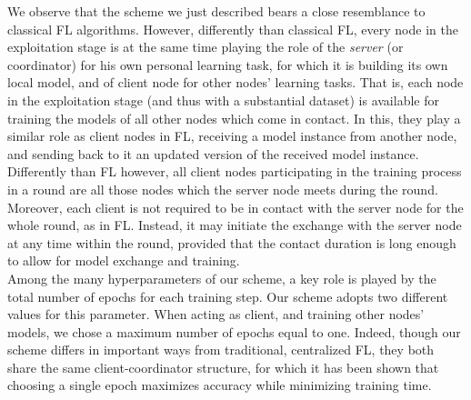 \documentclass[conference]{IEEEtran}
\begin{document}
We observe that the scheme we just described bears a close resemblance to classical FL algorithms. However, differently than classical FL, every node in the exploitation stage is at the same time playing the role of the \textit{server} (or coordinator) for his own personal learning task, for which it is building its own local model, and of client node for other nodes' learning tasks. That is, each node in the exploitation stage (and thus with a substantial dataset) is available for training the models of all other nodes which come in contact. In this, they play a similar role as client nodes in FL, receiving a model instance from another node, and sending back to it an updated version of the received model instance. Differently than FL however, all client nodes participating in the training process in a round are all those nodes which the server node meets during the round. Moreover, each client is not required to be in contact with the server node for the whole round, as in FL. Instead, it may initiate the exchange with the server node at any time within the round, provided that the contact duration is long enough to allow for model exchange and training.\\ 
Among the many hyperparameters of our scheme, a key role is played by the total number of epochs for each training step.
Our scheme adopts two different values for this parameter. %
When acting as client, and training other nodes' models, we chose a maximum number of epochs equal to one. Indeed, though our scheme differs in important ways from traditional, centralized FL, they both share the same client-coordinator structure, for which it has been shown \cite{mcmahan2017communication} that choosing a single epoch maximizes accuracy while minimizing training time.\\%
\end{document}
